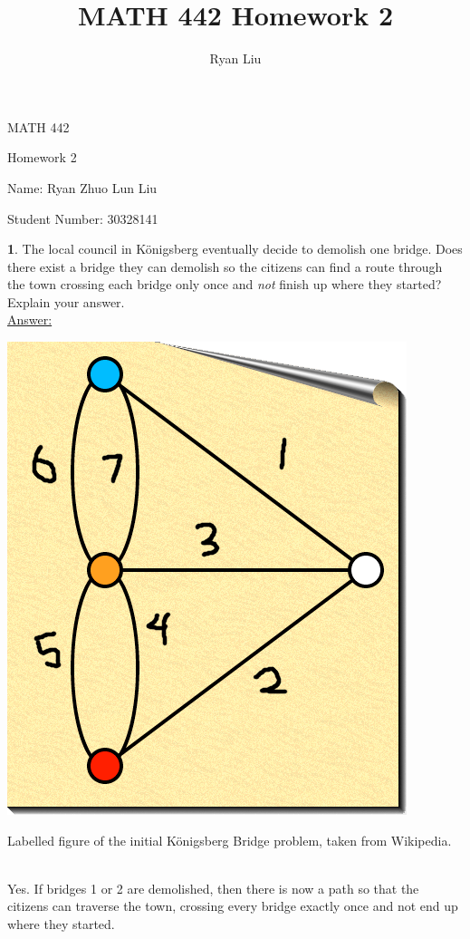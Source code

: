 \documentclass[12pt,a4paper]{article}
\author{Ryan Liu}
\title{MATH 442 Homework 2}
\theoremstyle{definition}
\newtheorem{problem}{}
\begin{document}
\begin{center}
{\huge MATH 442 \par}
{\Large Homework  2  \par}
{\normalsize Name: Ryan Zhuo Lun Liu \par}
{\normalsize Student Number: 30328141 \par}
\end{center}

\begin{problem}
The local council in K\"onigsberg eventually decide to demolish one bridge. Does there exist  a bridge they can demolish so the citizens can find a route through the town crossing each bridge only once and \emph{not} finish up where they started? Explain your answer. \\

\underline{Answer:} \\
\centerline{\includegraphics[scale=0.4]{bridge}}
\centerline{Labelled figure of the initial K\"onigsberg Bridge problem, taken from Wikipedia.} \\

Yes. If bridges 1 or 2 are demolished, then there is now a path so that the citizens can traverse the town, crossing every bridge exactly once and not end up where they started. \\


\end{problem}
\end{document}
